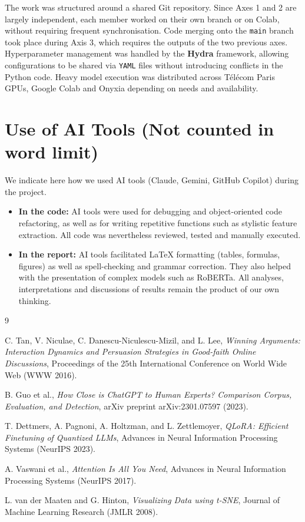 \documentclass[11pt,a4paper]{article}
\begin{document}
The work was structured around a shared Git repository. Since Axes 1 and 2 are
largely independent, each member worked on their own branch or on Colab, without
requiring frequent synchronisation. Code merging onto the \texttt{main} branch
took place during Axis 3, which requires the outputs of the two previous axes.
Hyperparameter management was handled by the \textbf{Hydra} framework, allowing
configurations to be shared via \texttt{YAML} files without introducing conflicts
in the Python code. Heavy model execution was distributed across Télécom Paris
GPUs, Google Colab and Onyxia depending on needs and availability.




\section{Use of AI Tools (Not counted in word limit)}

We indicate here how we used AI tools
(Claude, Gemini, GitHub Copilot) during the project.

\begin{itemize}
    \item \textbf{In the code:} AI tools were used for debugging
    and object-oriented code refactoring, as well as for writing repetitive
    functions such as stylistic feature extraction. All code was nevertheless
    reviewed, tested and manually executed.
    \item \textbf{In the report:} AI tools facilitated LaTeX formatting
    (tables, formulas, figures) as well as spell-checking and grammar
    correction. They also helped with the presentation of complex models such
    as RoBERTa. All analyses, interpretations and discussions of results
    remain the product of our own thinking.
\end{itemize}
\newpage
\begin{thebibliography}{9}

C. Tan, V. Niculae, C. Danescu-Niculescu-Mizil, and L. Lee,
\textit{Winning Arguments: Interaction Dynamics and Persuasion Strategies in Good-faith Online Discussions},
Proceedings of the 25th International Conference on World Wide Web (WWW 2016).

B. Guo et al.,
\textit{How Close is ChatGPT to Human Experts? Comparison Corpus, Evaluation, and Detection},
arXiv preprint arXiv:2301.07597 (2023).

T. Dettmers, A. Pagnoni, A. Holtzman, and L. Zettlemoyer,
\textit{QLoRA: Efficient Finetuning of Quantized LLMs},
Advances in Neural Information Processing Systems (NeurIPS 2023).

A. Vaswani et al.,
\textit{Attention Is All You Need},
Advances in Neural Information Processing Systems (NeurIPS 2017).

L. van der Maaten and G. Hinton,
\textit{Visualizing Data using t-SNE},
Journal of Machine Learning Research (JMLR 2008).

\end{thebibliography}
\end{document}

